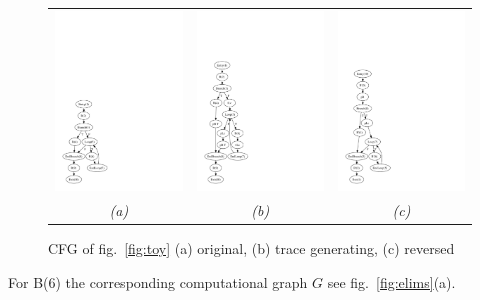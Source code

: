 \documentclass{book}
\newcommand{\reffig}[1]{{fig.~\ref{#1}}}
\begin{document}
\begin{figure}[ht]
  \centering
  \begin{tabular}{ccc}
    \includegraphics[width=.25\textwidth]{cfg_ts}
    &
    \includegraphics[width=.25\textwidth]{cfg_tape}
    &
    \includegraphics[width=.25\textwidth]{cfg_adj}
    \\
    \em (a) & \em (b) & \em (c)
  \end{tabular}
  \caption{CFG of \reffig{fig:toy} (a) original, (b) trace generating, (c) reversed}\label{fig:cfg}
\end{figure}
For B(6) the corresponding computational graph $G$  see 
\reffig{fig:elims}(a).  
\end{document}
